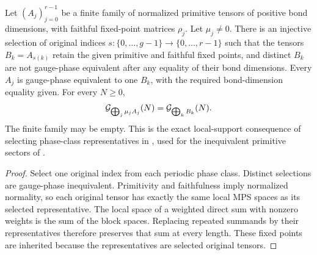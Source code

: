 \begin{lemma}
    \label{thm:primitive_sector_representatives_exact_support}
    \leanok
    Let $(A_j)_{j=0}^{r-1}$ be a finite family of normalized primitive tensors
    of positive bond dimensions, with faithful fixed-point matrices
    $\rho_j$. Let $\mu_j\neq0$. There is an injective selection of original
    indices $s:\{0,\ldots,g-1\}\to\{0,\ldots,r-1\}$ such that the tensors
    $B_k=A_{s(k)}$ retain the given primitive and faithful fixed points,
    and distinct $B_k$ are not gauge-phase equivalent after any equality
    of their bond dimensions. Every $A_j$ is gauge-phase equivalent to
    one $B_k$, with the required bond-dimension equality given.
    For every $N\geq0$,
    \begin{align}
        \mathcal G_{\bigoplus_j\mu_jA_j}(N)
        =\mathcal G_{\bigoplus_k B_k}(N).
        \notag
    \end{align}
    The finite family may be empty. This is the exact local-support
    consequence of selecting phase-class representatives in
    \cite[Proposition~2.7]{Cirac2016MPDO_arXiv}, used for the
    inequivalent primitive sectors of \cite[Section~3]{Nachtergaele1996Spectral}.
\end{lemma}
\begin{proof}\leanok
    Select one original index from each periodic phase class. Distinct
    selections are gauge-phase inequivalent. Primitivity and faithfulness
    imply normalized normality, so each original tensor has exactly the
    same local MPS spaces as its selected representative. The local space
    of a weighted direct sum with nonzero weights is the sum of the block
    spaces. Replacing repeated summands by their representatives therefore
    preserves that sum at every length. These fixed points are inherited because
    the representatives are selected original tensors.
\end{proof}

